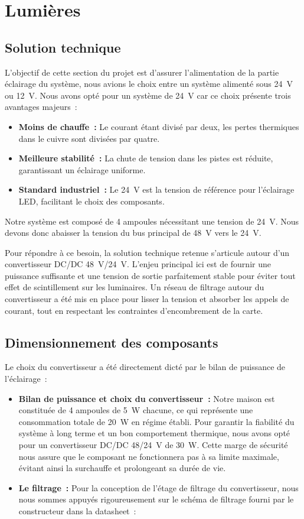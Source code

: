     \section{Lumières}
        \subsection{Solution technique}

L'objectif de cette section du projet est d'assurer l'alimentation de la partie éclairage du système, nous avions le choix entre un système alimenté sous 24~V ou 12~V. Nous avons opté pour un système de 24~V car ce choix présente trois avantages majeurs~:

\begin{itemize}
    \item \textbf{Moins de chauffe~:} Le courant étant divisé par deux, les pertes thermiques dans le cuivre sont divisées par quatre.
    \item \textbf{Meilleure stabilité~:} La chute de tension dans les pistes est réduite, garantissant un éclairage uniforme.
    \item \textbf{Standard industriel~:} Le 24~V est la tension de référence pour l'éclairage LED, facilitant le choix des composants.
\end{itemize}

Notre système est composé de 4 ampoules nécessitant une tension de 24~V. Nous devons donc abaisser la tension du bus principal de 48~V vers le 24~V.

Pour répondre à ce besoin, la solution technique retenue s'articule autour d'un convertisseur DC/DC 48~V/24~V. L'enjeu principal ici est de fournir une puissance suffisante et une tension de sortie parfaitement stable pour éviter tout effet de scintillement sur les luminaires. Un réseau de filtrage autour du convertisseur a été mis en place pour lisser la tension et absorber les appels de courant, tout en respectant les contraintes d'encombrement de la carte.

        \subsection{Dimensionnement des composants}

Le choix du convertisseur a été directement dicté par le bilan de puissance de l'éclairage~:

\begin{itemize}
    \item \textbf{Bilan de puissance et choix du convertisseur~:} Notre maison est constituée de 4 ampoules de 5~W chacune, ce qui représente une consommation totale de 20~W en régime établi. Pour garantir la fiabilité du système à long terme et un bon comportement thermique, nous avons opté pour un convertisseur DC/DC 48/24~V de 30~W. Cette marge de sécurité nous assure que le composant ne fonctionnera pas à sa limite maximale, évitant ainsi la surchauffe et prolongeant sa durée de vie.
    \item \textbf{Le filtrage~:} Pour la conception de l'étage de filtrage du convertisseur, nous nous sommes appuyés rigoureusement sur le schéma de filtrage fourni par le constructeur dans la datasheet~:
\end{itemize}

